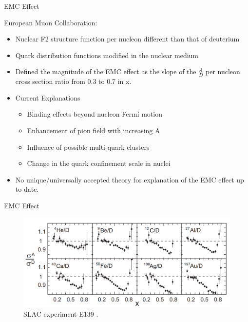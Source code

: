 \documentclass{beamer}
\begin{document}
\begin{frame}{EMC Effect}
	\vspace{-10pt}
	\begin{block}{}
		European Muon Collaboration:
		\begin{itemize}
			\item  Nuclear F2 structure function per nucleon different than that of deuterium
			\item Quark distribution functions modified in the nuclear medium
			\item Defined the magnitude of the EMC effect as the slope of the $\frac{A}{D}$ per nucleon cross section ratio from 0.3 to 0.7 in x.
			\item Current Explanations
			\begin{itemize}
				\item Binding effects beyond nucleon Fermi motion
				\item Enhancement of pion field with increasing A
				\item Influence of possible multi-quark clusters
				\item Change in the quark confinement scale in nuclei
			\end{itemize}
			\item No unique/universally accepted theory for explanation of the EMC effect up to date. 
		\end{itemize}
	\end{block}
\end{frame}

\begin{frame}{EMC Effect}

	\begin{figure}
		\caption{\label{EMC_slac} SLAC experiment E139 \cite{slac_emc}.}
		\includegraphics[width =12cm]{../images/EMC_slac_horiz.png}
	\end{figure}
	

\end{frame}
\end{document}
